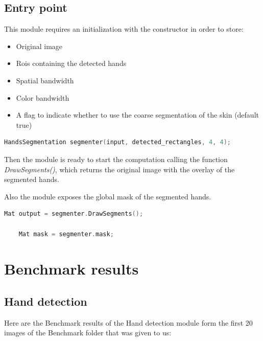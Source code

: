 \subsection{Entry point}

This module requires an initialization with the constructor in order to store:
\begin{itemize}
    \item Original image
    \item Rois containing the detected hands
    \item Spatial bandwidth
    \item Color bandwidth
    \item A flag to indicate whether to use the coarse segmentation of the skin (default true)
\end{itemize}
\begin{lstlisting}[language = c++]
    HandsSegmentation segmenter(input, detected_rectangles, 4, 4);
    \end{lstlisting}
Then the module is ready to start the computation calling the function \textit{DrawSegments()}, 
which returns the original image with the overlay of the segmented hands.

Also the module exposes the global mask of the segmented hands.

\begin{lstlisting}[language = c++]
    Mat output = segmenter.DrawSegments();

    Mat mask = segmenter.mask;
\end{lstlisting}

\clearpage
\section{Benchmark results}

\subsection{Hand detection}
Here are the Benchmark results of the Hand detection module form the first 20 images of the Benchmark folder that was given to us:

